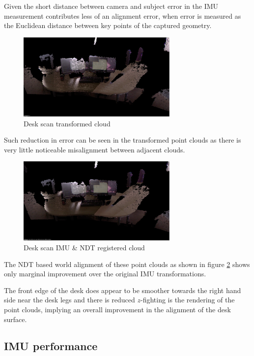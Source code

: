 \documentclass{entcs}
\begin{document}
Given the short distance between camera and subject error in the IMU measurement
contributes less of an alignment error, when error is measured as the Euclidean
distance between key points of the captured geometry.

\begin{figure}[h!]
  \centering
  \includegraphics[width=0.7\textwidth]{graphics/desk_transformed.eps}
  \caption{Desk scan transformed cloud}
  \label{fig:desk_transformed}
\end{figure}

Such reduction in error can be seen in the transformed point clouds as there is
very little noticeable misalignment between adjacent clouds.

\begin{figure}[h!]
  \centering
  \includegraphics[width=0.7\textwidth]{graphics/desk_world_ndt.eps}
  \caption{Desk scan IMU \& NDT registered cloud}
  \label{fig:desk_ndt}
\end{figure}

The NDT based world alignment of these point clouds as shown in figure
\ref{fig:desk_ndt} shows only marginal improvement over the original IMU
transformations.

The front edge of the desk does appear to be smoother towards the right hand
side near the desk legs and there is reduced $z$-fighting is the rendering of
the point clouds, implying an overall improvement in the alignment of the desk
surface.

\subsection{IMU performance}
\end{document}
